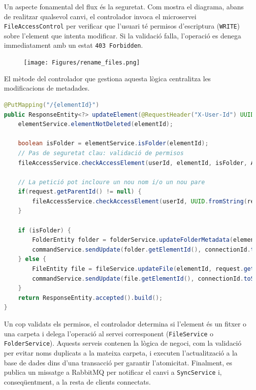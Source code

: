 Un aspecte fonamental del flux és la seguretat. Com mostra el diagrama, abans de realitzar qualsevol canvi, el controlador invoca el microservei \texttt{FileAccessControl} per verificar que l'usuari té permisos d'escriptura (\texttt{WRITE}) sobre l'element que intenta modificar. Si la validació falla, l'operació es denega immediatament amb un estat \texttt{403 Forbidden}.

\begin{figure}[H]
    \centering
    \texttt{[image: Figures/rename\_files.png]}
\end{figure}

El mètode del controlador que gestiona aquesta lògica centralitza les modificacions de metadades.

\begin{lstlisting}[language=Java, caption={Endpoint per a l'actualització de metadades a `ElementController`}]
@PutMapping("/{elementId}")
public ResponseEntity<?> updateElement(@RequestHeader("X-User-Id") UUID userId, @RequestHeader("X-Connection-Id") UUID connectionId, @RequestBody UpdateFileRequest request, @PathVariable("elementId") UUID elementId) {
    elementService.elementNotDeleted(elementId);
    
    boolean isFolder = elementService.isFolder(elementId);
    // Pas de seguretat clau: validació de permisos
    fileAccessService.checkAccessElement(userId, elementId, isFolder, AccessType.WRITE);
    
    // La petició pot incloure un nou nom i/o un nou pare
    if(request.getParentId() != null) {
        fileAccessService.checkAccessElement(userId, UUID.fromString(request.getParentId()), true, AccessType.WRITE);
    }

    if (isFolder) {
        FolderEntity folder = folderService.updateFolderMetadata(elementId, request.getName(), UUID.fromString(request.getParentId()));
        commandService.sendUpdate(folder.getElementId(), connectionId.toString(), userId.toString(), folder.getParent(), "", folder.getName(), "folder");
    } else {
        FileEntity file = fileService.updateFile(elementId, request.getName(), UUID.fromString(request.getParentId()));
        commandService.sendUpdate(file.getElementId(), connectionId.toString(), userId.toString(), file.getParent(), fileService.getHash(file.getId()), file.getName(), "file");
    }
    return ResponseEntity.accepted().build();
}
\end{lstlisting}

Un cop validats els permisos, el controlador determina si l'element és un fitxer o una carpeta i delega l'operació al servei corresponent (\texttt{FileService} o \texttt{FolderService}). Aquests serveis contenen la lògica de negoci, com la validació per evitar noms duplicats a la mateixa carpeta, i executen l'actualització a la base de dades dins d'una transacció per garantir l'atomicitat. Finalment, es publica un missatge a RabbitMQ per notificar el canvi a \texttt{SyncService} i, conseqüentment, a la resta de clients connectats.

